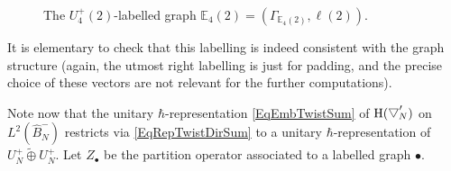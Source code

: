 \documentclass[11pt, reqno]{amsart}
\theoremstyle{definition}
\numberwithin{equation}{section}
\newcommand{\Nilp}{U}
\newcommand{\Bor}{B}
\newcommand{\sears}{\scaleobj{0.7}{\searrow}}
\newcommand{\seee}{\overset{\sears}{e}}
\newcommand{\sef}{\overset{\scaleobj{0.7}{\searrow}}{f}}
\newcommand{\wbtd}[1]{\raisebox{\depth}{$\bigtriangledown'$\!\!}_{#1}}
\newcommand{\Heiss}{\mathrm{H}}
\begin{document}
\begin{figure}[ht]
\caption{The $\Nilp_4^+(2)$-labelled graph $\mathbb{E}_4(2) = (\Gamma_{\mathbb{E}_4(2)},\ell(2))$.}
\label{fig:E-graphDoubled}
\end{figure}

It is elementary to check that this labelling is indeed consistent with the graph structure (again, the utmost right labelling is just for padding, and the precise choice of these vectors are not relevant for the further computations).

Note now that the unitary $\hbar$-representation \eqref{EqEmbTwistSum} of $\Heiss(\wbtd{N})$ on $L^2(\hat{\Bor}_N^-)$ restricts via \eqref{EqRepTwistDirSum} to a unitary $\hbar$-representation of $\Nilp_N^+\widetilde{\oplus}\Nilp_N^+$. Let $Z_{\bullet}$ be the partition operator associated to a labelled graph $\bullet$. 
\end{document}
